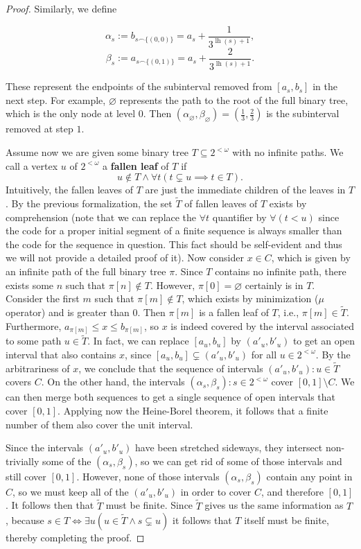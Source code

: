 \documentclass[../main.tex]{memoir}
\begin{document}
\begin{proof}
  Similarly, we define

  \[ \alpha_s := b_{s \frown \{(0, 0)\}} = a_s + \frac{1}{3^{\operatorname{lh}(s) + 1}}, \]
  \[ \beta_s := a_{s \frown \{(0, 1)\}} = a_s + \frac{2}{3^{\operatorname{lh}(s) + 1}}. \]

  These represent the endpoints of the subinterval removed from $[a_s, b_s]$ in the next step. For example, $\varnothing$ represents the path to the root of the full binary tree, which is the only node at level $0$. Then $(\alpha_{\varnothing}, \beta_{\varnothing}) = (\frac13, \frac23)$ is the subinterval removed at step $1$.

  Assume now we are given some binary tree $T \subseteq 2^{<\omega}$ with no infinite paths. We call a vertex $u$ of $2^{<\omega}$ a \textbf{fallen leaf} of $T$ if
  \[u \not\in T \land \forall t (t \subsetneq u \implies t \in T). \]
  Intuitively, the fallen leaves of $T$ are just the immediate children of the leaves in $T$. By the previous formalization, the set $\widetilde{T}$ of fallen leaves of $T$ exists by  comprehension (note that we can replace the $\forall t$ quantifier by $\forall (t < u)$ since the code for a proper initial segment of a finite sequence is always smaller than the code for the sequence in question. This fact should be self-evident and thus we will not provide a detailed proof of it). Now consider $x \in C$, which is given by an infinite path of the full binary tree $\pi$. Since $T$ contains no infinite path, there exists some $n$ such that $\pi[n] \not\in T$. However, $\pi[0] = \varnothing$ certainly is in $T$. Consider the first $m$ such that $\pi[m] \not\in T$, which exists by minimization ($\mu$ operator) and is greater than $0$. Then $\pi[m]$ is a fallen leaf of $T$, i.e., $\pi[m] \in \widetilde{T}$. Furthermore, $a_{\pi[m]} \le x \le b_{\pi[m]}$, so $x$ is indeed covered by the interval associated to some path $u \in \widetilde{T}$. In fact, we can replace $[a_u, b_u]$ by $(a'_u, b'_u)$ to get an open interval that also contains $x$, since $[a_u, b_u] \subsetneq (a'_u, b'_u)$ for all $u \in 2^{<\omega}$. By the arbitrariness of $x$, we conclude that the sequence of intervals $(a'_u, b'_u): u \in \widetilde{T}$ covers $C$. On the other hand, the intervals $(\alpha_s, \beta_s): s \in 2^{<\omega}$ cover $[0, 1] \setminus C$. We can then merge both sequences to get a single sequence of open intervals that cover $[0, 1]$. Applying now the Heine-Borel theorem, it follows that a finite number of them also cover the unit interval.

  Since the intervals $(a'_u, b'_u)$ have been stretched sideways, they intersect non-trivially some of the $(\alpha_s, \beta_s)$, so we can get rid of some of those intervals and still cover $[0, 1]$. However, none of those intervals $(\alpha_s, \beta_s)$ contain any point in $C$, so we must keep all of the $(a'_u, b'_u)$ in order to cover $C$, and therefore $[0, 1]$. It follows then that $\widetilde{T}$ must be finite. Since $\widetilde{T}$ gives us the same information as $T$, because $s \in T \iff \exists u (u \in \widetilde{T} \land s \subsetneq u)$ it follows that $T$ itself must be finite, thereby completing the proof.
\end{proof}
\end{document}

